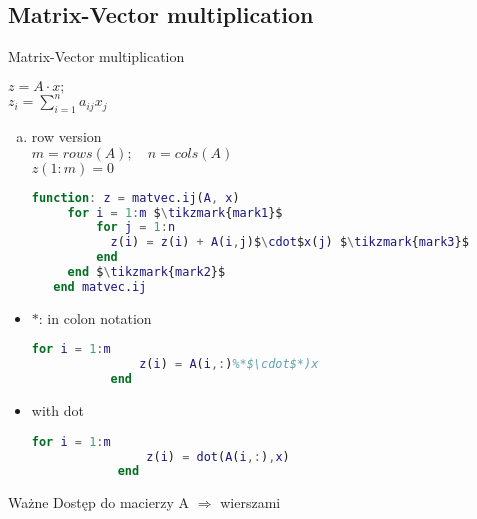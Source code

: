 \subsection{Matrix-Vector multiplication}

\begin{frame}[fragile]{Matrix-Vector multiplication}

$z = A \cdot x; $ \\
$z_i = \sum_{i=1}^n a_{i j}  x_j $ \\
\vspace{10px}
\begin{enumerate}[a)]
	\item row version \\
	$m = rows(A); \quad n = cols(A)$ \\
	$z(1:m) = 0$
\vspace{10px}

\begin{lstlisting}[language=Matlab, mathescape]
  function: z = matvec.ij(A, x)
     for i = 1:m $\tikzmark{mark1}$
         for j = 1:n
	       z(i) = z(i) + A(i,j)$\cdot$x(j) $\tikzmark{mark3}$
         end
     end $\tikzmark{mark2}$
   end matvec.ij\end{lstlisting}
\end{enumerate}
\end{frame}

\begin{frame}[fragile]
	\begin{itemize}
		\item $*$: in colon notation
		\vspace{7px}
		 \begin{lstlisting}[language=Matlab]
		   for i = 1:m
		       z(i) = A(i,:)%*$\cdot$*)x
		   end\end{lstlisting}

		 \item with dot
		 \vspace{7px}
		  \begin{lstlisting}[language=Matlab]
		    for i = 1:m
		        z(i) = dot(A(i,:),x)
		    end\end{lstlisting}
	\end{itemize}
 \begin{alertblock}{Ważne}
Dostęp do macierzy A $\Rightarrow$ wierszami
  \end{alertblock}

\end{frame}

